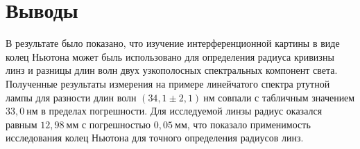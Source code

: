 \chapter{Выводы}
\label{ch:conclusions}


В результате было показано, что изучение интерференционной картины в виде колец Ньютона может быль использовано для определения радиуса кривизны линз и разницы длин волн двух узкополосных спектральных компонент света. Полученные результаты измерения на примере линейчатого спектра ртутной лампы для разности длин волн $(34,1 \pm 2,1) \ \text{нм}$ совпали с табличным значением $33,0 \ \text{нм}$ в пределах погрешности. Для исследуемой линзы радиус оказался равным $12,98 \ \text{мм}$ с погрешностью $0,05 \ \text{мм}$, что показало применимость исследования колец Ньютона для точного определения радиусов линз.